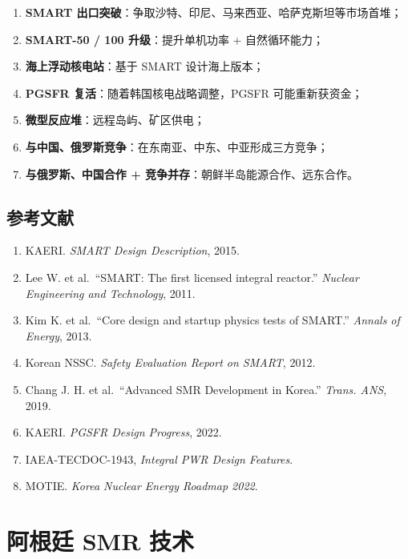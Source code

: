 \documentclass[
  UTF8,
  scheme=plain,
  fontsize=10pt,
  openany
]{ctexbook}
\begin{document}
\begin{enumerate}
\def\labelenumi{\arabic{enumi}.}
\tightlist
\item
  \textbf{SMART
  出口突破}：争取沙特、印尼、马来西亚、哈萨克斯坦等市场首堆；
\item
  \textbf{SMART-50 / 100 升级}：提升单机功率 + 自然循环能力；
\item
  \textbf{海上浮动核电站}：基于 SMART 设计海上版本；
\item
  \textbf{PGSFR 复活}：随着韩国核电战略调整，PGSFR 可能重新获资金；
\item
  \textbf{微型反应堆}：远程岛屿、矿区供电；
\item
  \textbf{与中国、俄罗斯竞争}：在东南亚、中东、中亚形成三方竞争；
\item
  \textbf{与俄罗斯、中国合作 + 竞争并存}：朝鲜半岛能源合作、远东合作。
\end{enumerate}

\section{参考文献}\label{ux53c2ux8003ux6587ux732e-12}

\begin{enumerate}
\def\labelenumi{\arabic{enumi}.}
\tightlist
\item
  KAERI. \emph{SMART Design Description}, 2015.
\item
  Lee W. et al.~``SMART: The first licensed integral reactor.''
  \emph{Nuclear Engineering and Technology}, 2011.
\item
  Kim K. et al.~``Core design and startup physics tests of SMART.''
  \emph{Annals of Energy}, 2013.
\item
  Korean NSSC. \emph{Safety Evaluation Report on SMART}, 2012.
\item
  Chang J. H. et al.~``Advanced SMR Development in Korea.'' \emph{Trans.
  ANS}, 2019.
\item
  KAERI. \emph{PGSFR Design Progress}, 2022.
\item
  IAEA-TECDOC-1943, \emph{Integral PWR Design Features}.
\item
  MOTIE. \emph{Korea Nuclear Energy Roadmap 2022}.
\end{enumerate}

\cleardoublepage

\chapter{阿根廷 SMR 技术}\label{ux963fux6839ux5ef7-smr-ux6280ux672f}
\end{document}

